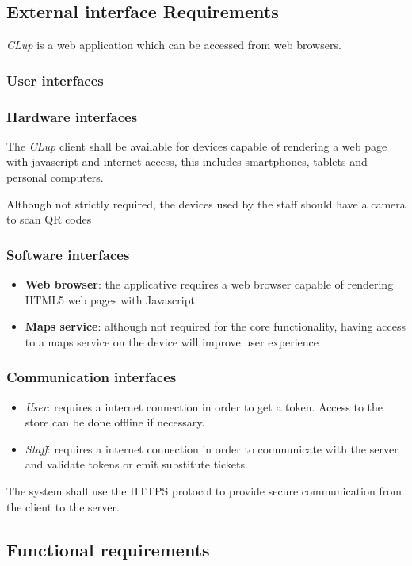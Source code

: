 \subsection{External interface Requirements}

\emph{CLup} is a web application which can be accessed from web browsers.

\subsubsection{User interfaces}
\subsubsection{Hardware interfaces}
The \emph{CLup} client shall be available for devices capable of rendering a web page with javascript and internet access, this includes smartphones, tablets and personal computers.

Although not strictly required, the devices used by the staff should have a camera to scan QR codes

\subsubsection{Software interfaces}
\begin{itemize}
    \item \textbf{Web browser}: the applicative requires a web browser capable of rendering HTML5 web pages with Javascript
    \item \textbf{Maps service}: although not required for the core functionality, having access to a maps service on the device will improve user experience
\end{itemize}

\subsubsection{Communication interfaces}
\begin{itemize}
    \item \emph{User}: requires a internet connection in order to get a token. Access to the store can be done offline if necessary.
    \item \emph{Staff}: requires a internet connection in order to communicate with the server and validate tokens or emit substitute tickets.
\end{itemize}
The system shall use the HTTPS protocol to provide secure communication from the client to the server.
\subsection{Functional requirements}

